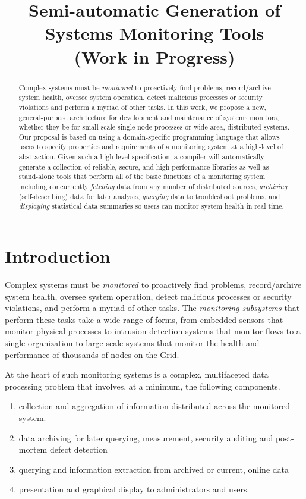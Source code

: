 \documentclass{sigplanconf}
\title{Semi-automatic Generation of Systems Monitoring Tools \\ (Work in Progress)}
\begin{document}
\maketitle{}

\begin{abstract}
Complex systems must be {\em monitored} to proactively find problems,
record/archive system health, oversee system operation, detect
malicious processes or security violations and perform a myriad of other 
tasks.  In this work, we propose a new, general-purpose architecture 
for development and maintenance of systems monitors, whether they
be for small-scale single-node processes or wide-area, 
distributed systems.  Our proposal is based on using 
a domain-specific programming language that allows users to specify
properties and requirements of a monitoring system at a high-level
of abstraction.  Given such a high-level specification,
a compiler will automatically generate a collection of
reliable, secure, and high-performance libraries as well as stand-alone
tools that perform all of the basic functions of a monitoring system
including concurrently {\em fetching} data from any number of distributed
sources, {\em archiving} (self-describing) data for later analysis,
{\em querying} data to troubleshoot problems, and {\em displaying}
statistical data summaries so users can monitor system health in real time.
\end{abstract}

\section{Introduction}
\label{sec:intro}

Complex systems must be {\em monitored} to proactively find problems,
record/archive system health, oversee system operation, detect
malicious processes or security violations, and perform a myriad of
other tasks.  The {\em monitoring subsystems} that perform these tasks
take a wide range of forms, from embedded sensors that monitor
physical processes to intrusion detection systems that monitor flows
to a single organization to large-scale systems that monitor the
health and performance of thousands of nodes on the Grid.

At the heart of such monitoring systems is a complex, multifaceted
data processing problem that involves, at a minimum, the following
components.
\begin{enumerate}
\item collection and aggregation of information 
distributed across the monitored system.
\item data archiving for later querying, measurement, security auditing and 
post-mortem defect detection
\item querying and information extraction from archived or current, online data
\item presentation and graphical display to administrators and users.
\end{enumerate}
\end{document}
